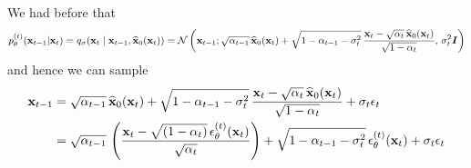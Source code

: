 We had before that 
\begin{equation}
    p_{\theta}^{(t)}({\mathbf{x}}_{t-1} | {\mathbf{x}}_t) = q_{\sigma}({\mathbf{x}}_t \mid {\mathbf{x}}_{t-1}, \widehat{{\mathbf{x}}}_0({\mathbf{x}}_t)) = 
    \mathcal{N} \left( {\mathbf{x}}_{t-1};
    \sqrt{\alpha_{t-1}}\, \widehat{{\mathbf{x}}}_0({\mathbf{x}}_t)
    + \sqrt{1 - \alpha_{t-1} - \sigma_t^2} \, \frac{{\mathbf{x}}_t - \sqrt{\alpha_t}\, \widehat{{\mathbf{x}}}_0({\mathbf{x}}_t)}{\sqrt{1-\alpha_t}}, \, \sigma_t^2 {\bm{I}}
    \right) 
\end{equation}
and hence we can sample
\begin{align}
    {\mathbf{x}}_{t-1} & = \sqrt{\alpha_{t-1}}\, \widehat{{\mathbf{x}}}_0({\mathbf{x}}_t)
    + \sqrt{1 - \alpha_{t-1} - \sigma_t^2} \, \frac{{\mathbf{x}}_t - \sqrt{\alpha_t}\, \widehat{{\mathbf{x}}}_0({\mathbf{x}}_t)}{\sqrt{1-\alpha_t}} + \sigma_t \epsilon_t \nonumber \\
    & = \sqrt{\alpha_{t-1}}\, \left( \frac{{\mathbf{x}}_t - \sqrt{(1 - \alpha_t)} \, \epsilon^{(t)}_\theta({\mathbf{x}}_t)}{\sqrt{\alpha_t}} \right)
    + \sqrt{1 - \alpha_{t-1} - \sigma_t^2} \, \epsilon^{(t)}_\theta({\mathbf{x}}_t) + \sigma_t \epsilon_t \nonumber \\
\end{align}



